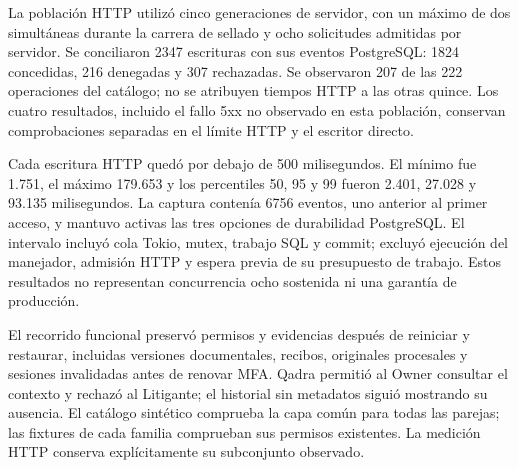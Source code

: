 La población HTTP utilizó cinco generaciones de servidor, con un máximo de dos
simultáneas durante la carrera de sellado y ocho solicitudes admitidas por
servidor. Se conciliaron 2347 escrituras con sus eventos PostgreSQL: 1824
concedidas, 216 denegadas y 307 rechazadas. Se observaron 207 de las 222
operaciones del catálogo; no se atribuyen tiempos HTTP a las otras quince.
Los cuatro resultados, incluido el fallo 5xx no observado en esta población,
conservan comprobaciones separadas en el límite HTTP y el escritor directo.

Cada escritura HTTP quedó por debajo de 500 milisegundos. El mínimo fue 1.751,
el máximo 179.653 y los percentiles 50, 95 y 99 fueron 2.401, 27.028 y 93.135
milisegundos. La captura contenía 6756 eventos, uno anterior al primer acceso,
y mantuvo activas las tres opciones de durabilidad PostgreSQL. El intervalo
incluyó cola Tokio, mutex, trabajo SQL y commit; excluyó ejecución del manejador,
admisión HTTP y espera previa de su presupuesto de trabajo. Estos resultados
no representan concurrencia ocho sostenida ni una garantía de producción.

El recorrido funcional preservó permisos y evidencias después de reiniciar y
restaurar, incluidas versiones documentales, recibos, originales procesales y
sesiones invalidadas antes de renovar MFA. Qadra permitió al Owner consultar
el contexto y rechazó al Litigante; el historial sin metadatos siguió mostrando
su ausencia. El catálogo sintético comprueba la capa común para todas las
parejas; las fixtures de cada familia comprueban sus permisos existentes. La
medición HTTP conserva explícitamente su subconjunto observado.
